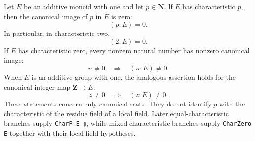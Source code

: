 \begin{definition}\label{mod:basic-characteristicconvention}
Let \(E\) be an additive monoid with one and let \(p\in\mathbf N\).
If \(E\) has characteristic \(p\), then the canonical image of \(p\)
in \(E\) is zero:
\[
 (p:E)=0.
\]
In particular, in characteristic two,
\[
 (2:E)=0.
\]
If \(E\) has characteristic zero, every nonzero natural number has
nonzero canonical image:
\[
 n\ne0\quad\Longrightarrow\quad(n:E)\ne0.
\]
When \(E\) is an additive group with one, the analogous assertion holds
for the canonical integer map \(\mathbf Z\to E\):
\[
 z\ne0\quad\Longrightarrow\quad(z:E)\ne0.
\]
These statements concern only canonical casts.  They do not identify
\(p\) with the characteristic of the residue field of a local field.
Later equal-characteristic branches supply \texttt{CharP E p}, while
mixed-characteristic branches supply \texttt{CharZero E} together with
their local-field hypotheses.
\leanok
{}
\FormalizationContract
\end{definition}
